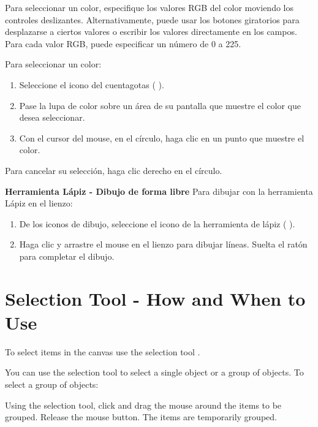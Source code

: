 


Para seleccionar un color, especifique los valores RGB del color moviendo los controles deslizantes. Alternativamente, puede usar los botones giratorios para desplazarse a ciertos valores o escribir los valores directamente en los campos. Para cada valor RGB, puede especificar un número de 0 a 225.




Para seleccionar un color:
\begin{enumerate}
  \item Seleccione el icono del cuentagotas ( ).

\item Pase la lupa de color sobre un área de su pantalla que muestre el color que desea seleccionar.

\item Con el cursor del mouse, en el círculo, haga clic en un punto que muestre el color.
\end{enumerate}

Para cancelar su selección, haga clic derecho en el círculo.

\textbf{Herramienta Lápiz - Dibujo de forma libre}
Para dibujar con la herramienta Lápiz en el lienzo:

\begin{enumerate}
  \item De los iconos de dibujo, seleccione el icono de la herramienta de lápiz ( ).

\item Haga clic y arrastre el mouse en el lienzo para dibujar líneas. Suelta el ratón para completar el dibujo.
\end{enumerate}

\section{Selection Tool - How and When to Use}
To select items in the canvas use the selection tool .

You can use the selection tool to select a single object or a group of objects. To select a group of objects:

Using the selection tool, click and drag the mouse around the items to be grouped. Release the mouse button. The items are temporarily grouped.

